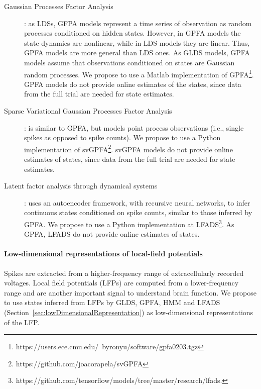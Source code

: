 \begin{description}
    \item[Gaussian Processes Factor Analysis]\citep[GPFA;][]{yuEtAl09}: as
        LDSs, GFPA models represent a time series of observation as random
        processes conditioned on hidden states. However, in GPFA models the
        state dynamics are nonlinear, while in LDS models they are linear.
        Thus, GPFA models are more general than LDS ones. As GLDS models, GPFA
        models assume that observations conditioned on states are Gaussian
        random processes. We propose to use a Matlab implementation of
        GPFA\footnote{https://users.ece.cmu.edu/~byronyu/software/gpfa0203.tgz}.
        GPFA models do not provide online estimates of the states, since data
        from the full trial are needed for state estimates.

    \item[Sparse Variational Gaussian Processes Factor
        Analysis]\citep[svGPFA;][]{dunckerAndSahani18}: is similar to GPFA, but
        models point process observations (i.e., single spikes as opposed to
        spike counts). We propose to use a Python implementation of
        svGPFA\footnote{https://github.com/joacorapela/svGPFA}.
        svGPFA models do not provide online estimates of states, since data
        from the full trial are needed for state estimates.

    \item[Latent factor analysis through dynamical
        systems]\citep[LFADS;][]{pandarinathEtAl18}: uses an autoencoder
        framework, with recursive neural networks, to infer continuous states
        conditioned on spike counts, similar to those inferred by GPFA. We
        propose to use a Python implementation at
        LFADS\footnote{https://github.com/tensorflow/models/tree/master/research/lfads.}.
        As GPFA, LFADS do not provide online estimates of states.

\end{description}

\paragraph{Low-dimensional representations of local-field potentials}
\label{sec:lowDimensionalRepresentationsOfLFPs}

Spikes are extracted from a higher-frequency range of extracellularly recorded
voltages. Local field potentials (LFPs) are computed from a lower-frequency
range and are another important signal to understand brain function. We propose
to use states inferred from LFPs by GLDS, GPFA, HMM and LFADS
(Section~\ref{sec:lowDimensionalRepresentation}) as
low-dimensional representations of the LFP.

